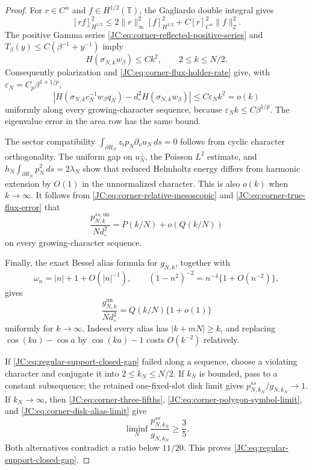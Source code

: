 \documentclass[11pt]{amsart}
\numberwithin{equation}{section}
\theoremstyle{definition}
\theoremstyle{remark}
\begin{document}
\begin{proof}
For $r\in C^\alpha$ and $f\in H^{1/2}(\mathbb T)$, the Gagliardo
double integral gives
\[
 [rf]_{H^{1/2}}^2
 \le2\|r\|_\infty^2[f]_{H^{1/2}}^2
 +C[r]_{C^\alpha}^2\|f\|_2^2.
\]
The positive Gamma series
\eqref{JC:eq:corner-reflected-positive-series} and
$T_\beta(y)\le C(\beta^{-1}+y^{-1})$ imply
\begin{equation}\label{JC:eq:corner-trace-energy-upper}
 H(\sigma_{N,k}w_\beta)\le Ck^2,
 \qquad2\le k\le N/2.
\end{equation}
Consequently polarization and
\eqref{JC:eq:corner-flux-holder-rate} give, with
$\varepsilon_N=C_p\beta^{1+1/p}$,
\begin{equation}\label{JC:eq:corner-true-flux-error}
 \left|H(\sigma_{N,k}c_N^{-1}w_\beta q_N)
 -d_\circ^2H(\sigma_{N,k}w_\beta)\right|
 \le C\varepsilon_Nk^2=o(k)
\end{equation}
uniformly along every growing-character sequence, because
$\varepsilon_Nk\le C\beta^{1/p}$.  The eigenvalue error in the area
row has the same bound.

The sector compatibility
$\int_{\partial R_N}z_ip_N\partial_\nu u_N\,ds=0$
follows from cyclic character orthogonality.  The uniform gap on
$u_N^\perp$, the Poisson $L^2$ estimate, and
$h_N\int_{\partial R_N}p_N^2\,ds=2\lambda_N$ show that reduced
Helmholtz energy differs from harmonic extension by $O(1)$ in the
unnormalized character.  This is also $o(k)$ when $k\to\infty$.
It follows from
\eqref{JC:eq:corner-relative-mesoscopic} and
\eqref{JC:eq:corner-true-flux-error} that
\begin{equation}\label{JC:eq:corner-polygon-symbol-limit}
 \frac{p^{ss,\mathrm{un}}_{N,k}}{Nd_\circ^2}
 =P(k/N)+o(Q(k/N))
\end{equation}
on every growing-character sequence.

Finally, the exact Bessel alias formula for $g_{N,k}$, together with
\[
 \omega_n=|n|+1+O(|n|^{-1}),\qquad
 (1-n^2)^{-2}=n^{-4}\{1+O(n^{-2})\},
\]
gives
\begin{equation}\label{JC:eq:corner-disk-alias-limit}
 \frac{g^{\mathrm{un}}_{N,k}}{Nd_\circ^2}
 =Q(k/N)\{1+o(1)\}
\end{equation}
uniformly for $k\to\infty$.  Indeed every alias has
$|k+mN|\ge k$, and replacing
$\cos(ka)-\cos a$ by $\cos(ka)-1$ costs $O(k^{-2})$
relatively.

If \eqref{JC:eq:regular-support-closed-gap} failed along a sequence, choose
a violating character and conjugate it into $2\le k_N\le N/2$.
If $k_N$ is bounded, pass to a constant subsequence; the retained
one-fixed-slot disk limit gives
$p^{ss}_{N,k_N}/g_{N,k_N}\to1$.  If $k_N\to\infty$, then
\eqref{JC:eq:corner-three-fifths},
\eqref{JC:eq:corner-polygon-symbol-limit}, and
\eqref{JC:eq:corner-disk-alias-limit} give
\[
 \liminf_N\frac{p^{ss}_{N,k_N}}{g_{N,k_N}}\ge\frac35.
\]
Both alternatives contradict a ratio below $11/20$.  This proves
\eqref{JC:eq:regular-support-closed-gap}.
\end{proof}
\end{document}
